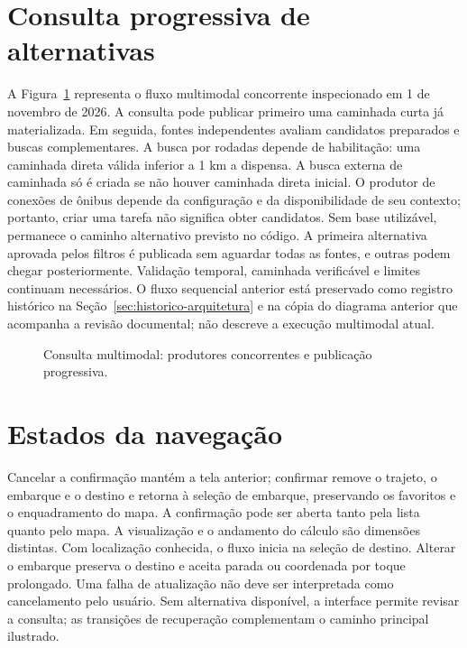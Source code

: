 \documentclass[12pt,oneside,a4paper,brazil,chapter=TITLE]{abntex2}
\let\papsection\section
\renewcommand{\section}{\clearpage\papsection}
\begin{document}
\begin{apendicesenv}
\section{Consulta progressiva de alternativas}
A Figura~\ref{fig:sequencia-pap} representa o fluxo multimodal concorrente inspecionado em 1 de novembro de 2026. A consulta pode publicar primeiro uma caminhada curta já materializada. Em seguida, fontes independentes avaliam candidatos preparados e buscas complementares. A busca por rodadas depende de habilitação: uma caminhada direta válida inferior a 1 km a dispensa. A busca externa de caminhada só é criada se não houver caminhada direta inicial. O produtor de conexões de ônibus depende da configuração e da disponibilidade de seu contexto; portanto, criar uma tarefa não significa obter candidatos. Sem base utilizável, permanece o caminho alternativo previsto no código. A primeira alternativa aprovada pelos filtros é publicada sem aguardar todas as fontes, e outras podem chegar posteriormente. Validação temporal, caminhada verificável e limites continuam necessários. O fluxo sequencial anterior está preservado como registro histórico na Seção~\ref{sec:historico-arquitetura} e na cópia do diagrama anterior que acompanha a revisão documental; não descreve a execução multimodal atual.

\begin{figure}[H]
\centering
\caption{Consulta multimodal: produtores concorrentes e publicação progressiva.}\label{fig:sequencia-pap}
\end{figure}

\section{Estados da navegação}
Cancelar a confirmação mantém a tela anterior; confirmar remove o trajeto, o embarque e o destino e retorna à seleção de embarque, preservando os favoritos e o enquadramento do mapa. A confirmação pode ser aberta tanto pela lista quanto pelo mapa. A visualização e o andamento do cálculo são dimensões distintas. Com localização conhecida, o fluxo inicia na seleção de destino. Alterar o embarque preserva o destino e aceita parada ou coordenada por toque prolongado. Uma falha de atualização não deve ser interpretada como cancelamento pelo usuário. Sem alternativa disponível, a interface permite revisar a consulta; as transições de recuperação complementam o caminho principal ilustrado.


\end{apendicesenv}
\end{document}
